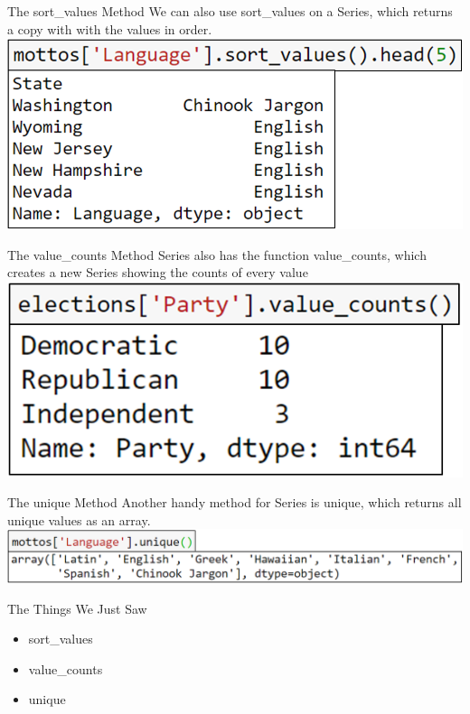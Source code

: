 \documentclass[aspectratio=169]{../latex_main/tntbeamer}  %
\begin{document}
	
	
	\begin{frame}{The sort\_values Method}
	   We can also use sort\_values on a Series, which returns a copy with with the values in order.\\
	    \includegraphics[scale=.5]{Bild39}
	\end{frame}
	
	\begin{frame}{The value\_counts Method}
	   Series also has the function value\_counts, which creates a new Series showing the counts of every value\\
	    \includegraphics[scale=.6]{Bild40}
	\end{frame}
	
	
	\begin{frame}{The unique Method}
	   Another handy method for Series  is unique, which returns all unique values as an array.\\
	    \includegraphics[scale=.4]{Bild41}
	\end{frame}
	
	
	\begin{frame}{The Things We Just Saw}
	    \begin{itemize}
	        \item sort\_values
	        \item value\_counts
	        \item unique
	    \end{itemize}
	\end{frame}
	
\end{document}
